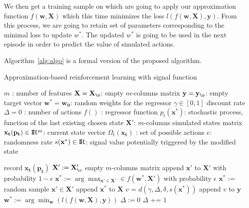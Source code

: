 \documentclass[letterpaper, 10.5 pt, conference]{ieeeconf}
\newcommand{\B}[1]{\mathbf{#1}}
\begin{document}
We then get a training sample on which are going to apply our approximation function $f(\B{w}, \B{X})$ which this time minimizes the loss $l(f(\B{w}, \B{X}),\B{y})$. From this process, we are going to retain set of parameters corresponding to the minimal loss to update $w^*$. The updated $w^*$ is going to be used in the next episode in order to predict the value of simulated actions.

Algorithm~\ref{alg:algo} is a formal version of the proposed algorithm.

\begin{algorithm}
\caption{Approximation-based reinforcement learning with signal function}
\label{alg:algo}
\begin{algorithmic}[1]

\State $m$ : number of features
\State $\B{X}=\B{X_{\o}}$: empty $m$-columns matrix
\State $\B{y}=\B{y_{\o}}$: empty target vector
\State $\B{w^*}=\B{w_0}$: random weights for the regressor
\State $\gamma \in [0,1]$  discount rate
\State $\Delta = 0$ : number of actions
\State $f()$ : regressor function
\State $p_t(\B{x^*})$: stochastic process, function of the last existing chosen state
\State $\B{X'}$: $m$-columns simulated states matrix
\State $\B{x_t(p_t)} \in {\rm I\!R^m}$: current state vector
\State $\Omega_t(\B{x_t})$ : set of possible actions
\State $\epsilon$: randomness rate
\State $s(\B{x^*}) \in {\rm I\!R}$: signal value potentially triggered by the modified state

  \State record $\B{x_t(p_t)}$
    \State $\B{X'} :=\B{X'_{\o}}$ empty $m$-columns matrix
    \For{$\B{x'}$  in  $\Omega(\B{x_t})$}
      \State append  $\B{x'}$  to  $\B{X'}$
    \EndFor
    \State with probability  $1-\epsilon$
    \State \hspace{0.5cm} $\B{x^*}:=\arg\max_{\B{x'} \in \B{X'}} \in f(\B{w^*},\B{X'})$
    \State with probability  $\epsilon$
    \State \hspace{0.5cm} $\B{x^*}$ := random sample $\B{x'} \in \B{X'}$
    \State append $\B{x^*}$ to $\B{X}$
    \If{$s(\B{x^*})$  !=  $0$}
        \State $v$ = $d(\gamma, \Delta, \delta, s(\B{x^*}))$
        \State append  $v$  to  $\B{y}$
       \EndFor
      \State $\B{w^*} := \arg\min_{\B{w}}(l(f(\B{w},\B{X}),\B{y}))$
      \State $\Delta := 0$
    \Else
      \State $\Delta$ += $1$
    \EndIf
\EndWhile

\end{algorithmic}
\end{algorithm}
\end{document}
